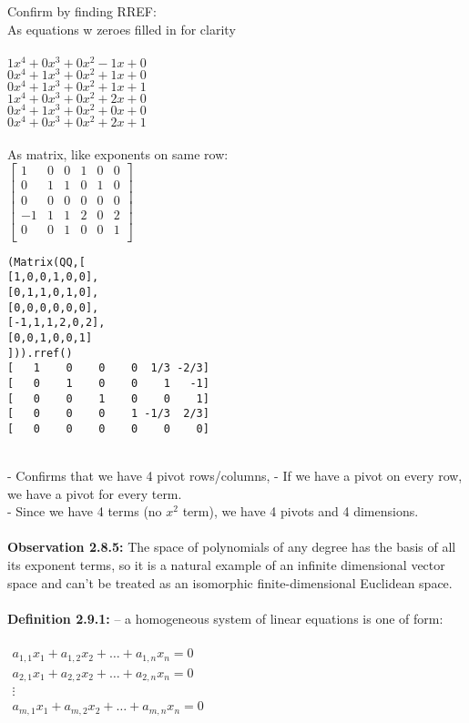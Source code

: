 \documentclass{article}
\begin{document}
Confirm by finding RREF:\\
\noindent As equations w zeroes filled in for clarity\\
\\
$1x^{4} + 0x^{3} + 0x^{2} - 1x + 0$\\
$0x^{4} + 1x^{3} + 0x^{2} + 1x + 0$\\
$0x^{4} + 1x^{3} + 0x^{2} + 1x + 1$\\
$1x^{4} + 0x^{3} + 0x^{2} + 2x + 0$\\
$0x^{4} + 1x^{3} + 0x^{2} + 0x + 0$\\
$0x^{4} + 0x^{3} + 0x^{2} + 2x + 1$\\
\\
As matrix, like exponents on same row:\\
$\left[ \begin{matrix} 
1 & 0 & 0 & 1 & 0 & 0\\
0 & 1 & 1 & 0 & 1 & 0\\
0 & 0 & 0 & 0 & 0 & 0\\
-1& 1 & 1 & 2 & 0 & 2\\
0 & 0 & 1 & 0 & 0 & 1 \\
\end{matrix} \right]$
\\
\begin{verbatim}
(Matrix(QQ,[
[1,0,0,1,0,0],
[0,1,1,0,1,0],
[0,0,0,0,0,0],
[-1,1,1,2,0,2],
[0,0,1,0,0,1]
])).rref()
[   1    0    0    0  1/3 -2/3]
[   0    1    0    0    1   -1]
[   0    0    1    0    0    1]
[   0    0    0    1 -1/3  2/3]
[   0    0    0    0    0    0]
\end{verbatim}\\
- Confirms that we have 4 pivot rows/columns,
- If we have a pivot on every row, we have a pivot for every term.\\
- Since we have 4 terms (no $x^{2}$ term), we have 4 pivots and 4 dimensions.\\
\\
\textbf{Observation 2.8.5:} The space of polynomials of any degree has the basis of all its exponent terms, so it is a natural example of an infinite dimensional vector space and can't be treated as an isomorphic finite-dimensional Euclidean space. \\
\\
\newpage
\noindent \textbf{Definition 2.9.1:} -- a homogeneous system of linear equations is one of form: \\
\\
$\begin{matrix} 
a_{1,1}x_{1} + a_{1,2}x_{2} + \dots + a_{1,n}x_{n} = 0\\
a_{2,1}x_{1} + a_{2,2}x_{2} + \dots + a_{2,n}x_{n} = 0\\
\vdots  \\
a_{m,1}x_{1} + a_{m,2}x_{2} + \dots + a_{m,n}x_{n} = 0\\
\end{matrix}$\\
\end{document}
